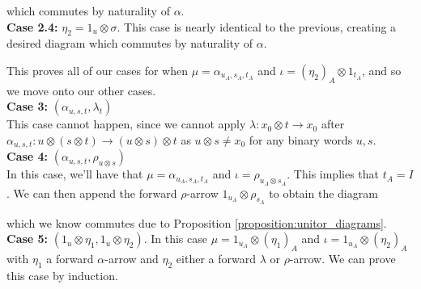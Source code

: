 \begin{varprf}
\begin{center}
    \end{center}    
    which commutes by naturality of $\alpha$. 
    \\
    \textbf{Case 2.4:} $\eta_2 = 1_u \otimes \sigma$. This case 
    is nearly identical to the previous, creating a desired diagram 
    which commutes by naturality of $\alpha$. 

    This proves all of our cases for when $\mu = \alpha_{u_A,s_A,t_A}$ 
    and $\iota = (\eta_2)_A \otimes 1_{t_A}$, and so we move onto our other 
    cases. 
    \\
    \textbf{Case 3:} $(\alpha_{u,s,t}, \lambda_{t})$\\
    This case cannot happen, since we cannot apply $\lambda: x_0 \otimes t \to x_0$
    after $\alpha_{u,s,t}: u\otimes (s\otimes t) 
    \to (u \otimes s)\otimes t$ as $u \otimes s \ne x_0$ for any binary words $u, s$. 
    \\
    \textbf{Case 4:} $(\alpha_{u,s,t}, \rho_{u\otimes s})$\\
    In this case, we'll have that $\mu = \alpha_{u_A,s_A,t_A}$ and 
    $\iota = \rho_{u_A \otimes s_A}$. This implies that 
    $t_A = I$. 
    We can then append the forward $\rho$-arrow $1_{u_A}\otimes \rho_{s_A}$ 
    to obtain the diagram 
    \begin{center}
    \end{center}    
    which we know commutes due to Proposition \ref{proposition:unitor_diagrams}.
    \\
    \textbf{Case 5:} $(1_u \otimes \eta_1, 1_u \otimes \eta_2)$.
    In this case $\mu = 1_{u_A}\otimes (\eta_1)_A$ and 
    $\iota = 1_{u_A}\otimes (\eta_2)_A$ with $\eta_1$ a forward $\alpha$-arrow 
    and $\eta_2$ either a forward $\lambda$ or $\rho$-arrow. 
    We can prove this case by induction. 
    

\end{varprf}
